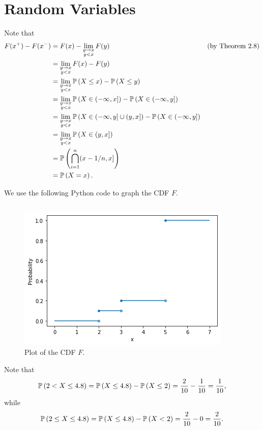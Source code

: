 \chapter{Random Variables}

\begin{ex}
  Note that
  \begin{align*}
    F(x^+)-F(x^-)
     & =F(x)-\lim_{\substack{y\to x    \\ y < x}}F(y) & & \text{(by Theorem 2.8)} \\
     & =\lim_{\substack{y\to x         \\ y < x}}F(x)-F(y) \\
     & =\lim_{\substack{y\to x         \\ y < x}}\P{X\leq x}-\P{X\leq y} \\
     & =\lim_{\substack{y\to x         \\ y < x}}\P{X\in (-\infty, x]}-\P{X\in (-\infty, y]} \\
     & =\lim_{\substack{y\to x         \\ y < x}}\P{X\in (-\infty, y]\cup(y, x]}-\P{X\in (-\infty, y]} \\
     & =\lim_{\substack{y\to x         \\ y < x}}\P{X\in (y, x]} \\
     & =\P{\bigcap_{i=1}^n (x-1/n, x]} \\
     & =\P{X=x}.
  \end{align*}
\end{ex}

\begin{ex}
  We use the following Python code to graph the CDF $F$.
  \inputminted{python}{src/02-02.py}

  \begin{figure}[H]
    \centering
    \includegraphics[scale=0.7]{part1/ch02-02}
    \caption{Plot of the CDF $F$.}
  \end{figure}

  Note that
  \[
    \P{2< X\leq 4.8}
    =\P{X\leq 4.8}-\P{X\leq 2}
    =\frac{2}{10}-\frac{1}{10}
    =\frac{1}{10},
  \]
  while
  \[
    \P{2\leq X\leq 4.8}=\P{X\leq 4.8}-\P{X< 2}=\frac{2}{10}-0=\frac{2}{10}.
  \]
\end{ex}

